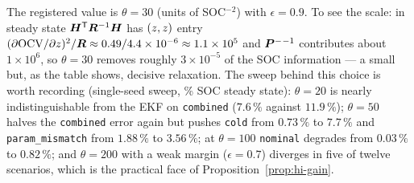 The registered value is $\theta=30$ (units of SOC$^{-2}$) with $\epsilon=0.9$.  To see the scale:
in steady state $\bm{H}^{\mathsf{T}}\bm{R}^{-1}\bm{H}$ has $(z,z)$ entry
$(\partial\mathrm{OCV}/\partial z)^2/\bm{R} \approx 0.49/4.4\times10^{-6}\approx1.1\times10^{5}$ and
$\bm{P}^{-}{}^{-1}$ contributes about $1\times10^{6}$, so $\theta=30$ removes roughly $3\times10^{-5}$ of
the SOC information --- a small but, as the table shows, decisive relaxation.  The sweep behind
this choice is worth recording (single-seed sweep, \% SOC steady state): $\theta=20$ is nearly
indistinguishable from the EKF on \texttt{combined} ($7.6\,\%$ against $11.9\,\%$);
$\theta=50$ halves the \texttt{combined} error again but pushes \texttt{cold} from $0.73\,\%$ to
$7.7\,\%$ and \texttt{param\_mismatch} from $1.88\,\%$ to $3.56\,\%$; at $\theta=100$
\texttt{nominal} degrades from $0.03\,\%$ to $0.82\,\%$; and $\theta=200$ with a weak margin
($\epsilon=0.7$) diverges in five of twelve scenarios, which is the practical face of
Proposition~\ref{prop:hi-gain}.

